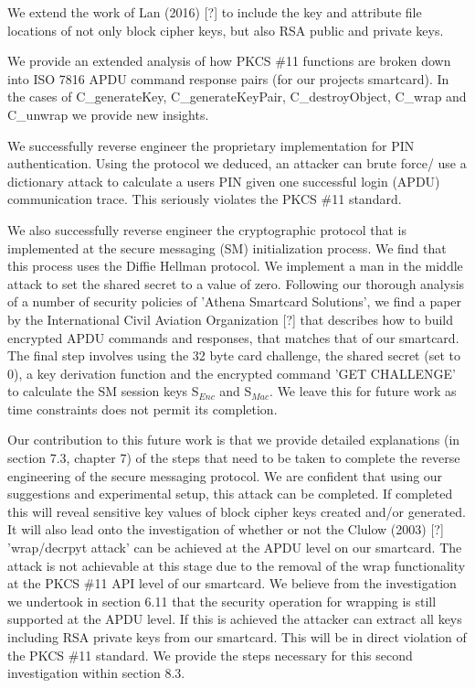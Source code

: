 \documentclass[bsc,frontabs,twoside,singlespacing,parskip,deptreport]{infthesis}     %
\begin{document}
We extend the work of Lan (2016) [?] to include the key and attribute file locations of not only block cipher keys, but also RSA public and private keys.

We provide an extended analysis of how PKCS \#11 functions are broken down into ISO 7816 APDU command response pairs (for our projects smartcard). In the cases of C\_generateKey, C\_generateKeyPair, C\_destroyObject, C\_wrap and C\_unwrap we provide new insights.

We successfully reverse engineer the proprietary implementation for PIN authentication. Using the protocol we deduced, an attacker can brute force/ use a dictionary attack to calculate a users PIN given one successful login (APDU) communication trace. This seriously violates the PKCS \#11 standard.

We also successfully reverse engineer the cryptographic protocol that is implemented at the secure messaging (SM) initialization process. We find that this process uses the Diffie Hellman protocol. We implement a man in the middle attack to set the shared secret to a value of zero. Following our thorough analysis of a number of security policies of 'Athena Smartcard Solutions', we find a paper by the International Civil Aviation Organization [?] that describes how to build encrypted APDU commands and responses, that matches that of our smartcard. The final step involves using the 32 byte card challenge, the shared secret (set to 0), a key derivation function and the encrypted command 'GET CHALLENGE' to calculate the SM session keys S$_{Enc}$ and S$_{Mac}$. We leave this for future work as time constraints does not permit its completion.

Our contribution to this future work is that we provide detailed explanations (in section 7.3, chapter 7) of the steps that need to be taken to complete the reverse engineering of the secure messaging protocol. We are confident that using our suggestions and experimental setup, this attack can be completed. If completed this will reveal sensitive key values of block cipher keys created and/or generated. It will also lead onto the investigation of whether or not the Clulow (2003) [?] 'wrap/decrpyt attack' can be achieved at the APDU level on our smartcard. The attack is not achievable at this stage due to the removal of the wrap functionality at the PKCS \#11 API level of our smartcard. We believe from the investigation we undertook in section 6.11 that the security operation for wrapping is still supported at the APDU level. If this is achieved the attacker can extract all keys including RSA private keys from our smartcard. This will be in direct violation of the PKCS \#11 standard. We provide the steps necessary for this second investigation within section 8.3.
\end{document}
